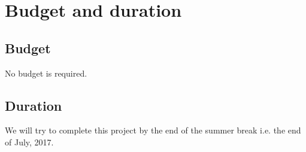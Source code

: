 \documentclass{article}
\begin{document}
	\section{Budget and duration}	
		\subsection{Budget}
			No budget is required.
					
		\subsection{Duration}
			We will try to complete this project by the end of the summer break i.e. the end of July, 2017. 
\end{document}
